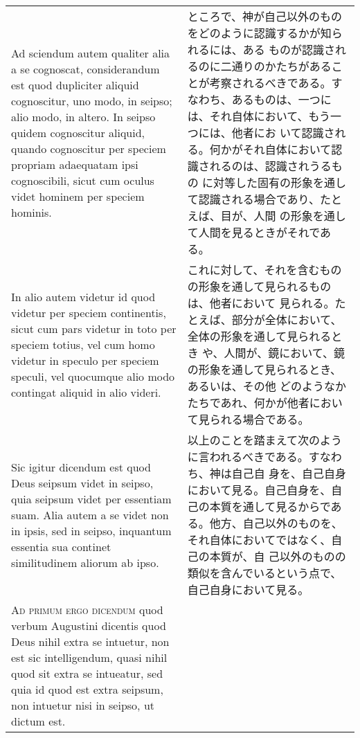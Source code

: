 \documentclass[10pt]{jsarticle} %
\begin{document}
\begin{longtable}{p{21em}p{21em}}
\\


Ad sciendum autem qualiter alia a se cognoscat, considerandum est quod
dupliciter aliquid cognoscitur, uno modo, in seipso; alio modo, in
altero. In seipso quidem cognoscitur aliquid, quando cognoscitur per
speciem propriam adaequatam ipsi cognoscibili, sicut cum oculus videt
hominem per speciem hominis.


&

ところで、神が自己以外のものをどのように認識するかが知られるには、ある
ものが認識されるのに二通りのかたちがあることが考察されるべきである。す
なわち、あるものは、一つには、それ自体において、もう一つには、他者にお
いて認識される。何かがそれ自体において認識されるのは、認識されうるもの
に対等した固有の形象を通して認識される場合であり、たとえば、目が、人間
の形象を通して人間を見るときがそれである。


\\


In alio autem videtur id quod videtur per speciem continentis, sicut
cum pars videtur in toto per speciem totius, vel cum homo videtur in
speculo per speciem speculi, vel quocumque alio modo contingat aliquid
in alio videri.



&

これに対して、それを含むものの形象を通して見られるものは、他者において
見られる。たとえば、部分が全体において、全体の形象を通して見られるとき
や、人間が、鏡において、鏡の形象を通して見られるとき、あるいは、その他
どのようなかたちであれ、何かが他者において見られる場合である。

\\

Sic igitur dicendum est quod Deus seipsum videt in seipso, quia
seipsum videt per essentiam suam. Alia autem a se videt non in ipsis,
sed in seipso, inquantum essentia sua continet similitudinem aliorum
ab ipso.

&

以上のことを踏まえて次のように言われるべきである。すなわち、神は自己自
身を、自己自身において見る。自己自身を、自己の本質を通して見るからであ
る。他方、自己以外のものを、それ自体においてではなく、自己の本質が、自
己以外のものの類似を含んでいるという点で、自己自身において見る。



\\


{\scshape Ad primum ergo dicendum} quod verbum Augustini dicentis quod
Deus nihil extra se intuetur, non est sic intelligendum, quasi nihil
quod sit extra se intueatur, sed quia id quod est extra seipsum, non
intuetur nisi in seipso, ut dictum est.



\end{longtable}
\end{document}
